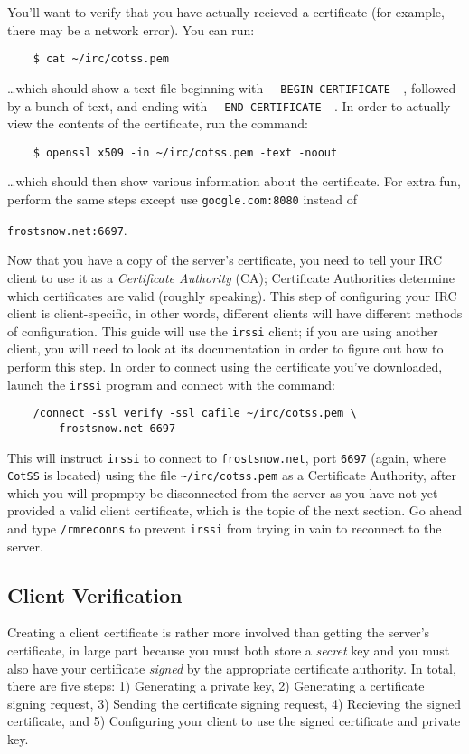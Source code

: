 \documentclass{article}
\begin{document}
You'll want to verify that you have actually recieved a certificate (for example, there may be a network error).  You can run:
\begin{lstlisting}
	$ cat ~/irc/cotss.pem
\end{lstlisting}
\ldots which should show a text file beginning with \texttt{-----BEGIN CERTIFICATE-----}, followed by a bunch of text, and ending with \texttt{-----END CERTIFICATE-----}.  In order to actually view the contents of the certificate, run the command:
\begin{lstlisting}
	$ openssl x509 -in ~/irc/cotss.pem -text -noout
\end{lstlisting}
\ldots which should then show various information about the certificate.  For extra fun, perform the same steps except use \texttt{google.com:8080} instead of {\texttt{frostsnow.net:6697}.

Now that you have a copy of the server's certificate, you need to tell your IRC client to use it as a \textit{Certificate Authority} (CA); Certificate Authorities determine which certificates are valid (roughly speaking).  This step of configuring your IRC client is client-specific, in other words, different clients will have different methods of configuration.  This guide will use the \texttt{irssi} client; if you are using another client, you will need to look at its documentation in order to figure out how to perform this step.  In order to connect using the certificate you've downloaded, launch the \texttt{irssi} program and connect with the command:
\begin{lstlisting}
    /connect -ssl_verify -ssl_cafile ~/irc/cotss.pem \
        frostsnow.net 6697
\end{lstlisting}
This will instruct \texttt{irssi} to connect to \texttt{frostsnow.net}, port \texttt{6697} (again, where \texttt{CotSS} is located) using the file \texttt{\textasciitilde/irc/cotss.pem} as a Certificate Authority, after which you will propmpty be disconnected from the server as you have not yet provided a valid client certificate, which is the topic of the next section.  Go ahead and type \texttt{/rmreconns} to prevent \texttt{irssi} from trying in vain to reconnect to the server.

\subsection{Client Verification}
Creating a client certificate is rather more involved than getting the server's certificate, in large part because you must both store a \textit{secret} key and you must also have your certificate \textit{signed} by the appropriate certificate authority.  In total, there are five steps: 1) Generating a private key, 2) Generating a certificate signing request, 3) Sending the certificate signing request, 4) Recieving the signed certificate, and 5) Configuring your client to use the signed certificate and private key.

}
\end{document}
